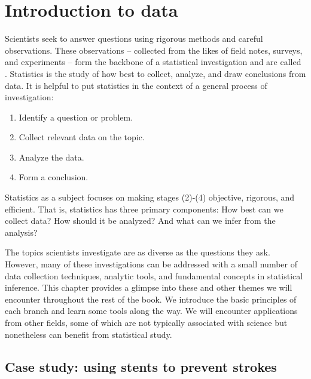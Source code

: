 \chapter{Introduction to data}
\label{introductionToData}


Scientists seek to answer questions using rigorous methods and careful observations. These observations -- collected from the likes of field notes, surveys, and experiments -- form the backbone of a statistical investigation and are called . Statistics is the study of how best to collect, analyze, and draw conclusions from data. It is helpful to put statistics in the context of a general process of investigation:
\begin{enumerate}
\setlength{\itemsep}{0mm}
\item Identify a question or problem.
\item Collect relevant data on the topic.
\item Analyze the data.
\item Form a conclusion.
\end{enumerate}
Statistics as a subject focuses on making stages (2)-(4) objective, rigorous, and efficient. That is, statistics has three primary components: How best can we collect data? How should it be analyzed? And what can we infer from the analysis?

The topics scientists investigate are as diverse as the questions they ask. However, many of these investigations can be addressed with a small number of data collection techniques, analytic tools, and fundamental concepts in statistical inference. This chapter provides a glimpse into these and other themes we will encounter throughout the rest of the book. We introduce the basic principles of each branch and learn some tools along the way. We will encounter applications from other fields, some of which are not typically associated with science but nonetheless can benefit from statistical study.

\section[Case study]{Case study: using stents to prevent strokes}
\label{basicExampleOfStentsAndStrokes}

